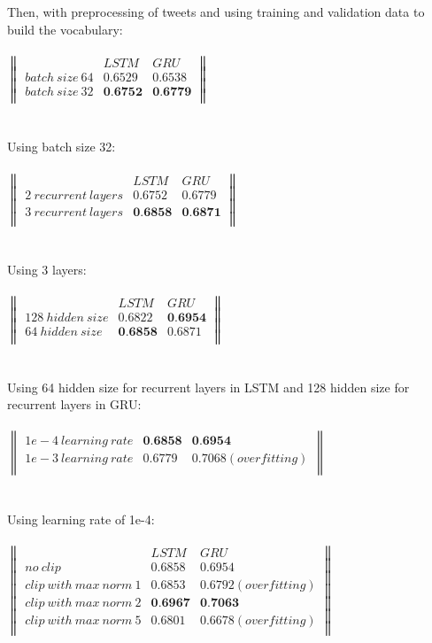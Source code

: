\documentclass{article}
\begin{document}
Then, with preprocessing of tweets and using training and validation data to build the vocabulary: \\ \\
$\begin{Vmatrix}
& LSTM & GRU \\
batch\ size\ 64  & 0.6529 & 0.6538\\
batch\ size\ 32  & \textbf{0.6752} & \textbf{0.6779}\\
\end{Vmatrix}$ \\ \\ \\
Using batch size 32: \\ \\
$\begin{Vmatrix}
& LSTM & GRU \\
2\ recurrent\ layers  & 0.6752 & 0.6779\\
3\ recurrent\ layers  & \textbf{0.6858} & \textbf{0.6871}\\
\end{Vmatrix}$ \\ \\ \\
Using 3 layers: \\ \\
$\begin{Vmatrix}
& LSTM & GRU \\
128\ hidden\ size  & 0.6822 & \textbf{0.6954}\\
64\ hidden\ size  & \textbf{0.6858} & 0.6871\\
\end{Vmatrix}$ \\ \\ \\
Using 64 hidden size for recurrent layers in LSTM and 128 hidden size for recurrent layers in GRU: \\ \\
$\begin{Vmatrix}
1e-4\ learning\ rate & \textbf{0.6858} & \textbf{0.6954}\\
1e-3\ learning\ rate & 0.6779 & 0.7068(overfitting)\\
\end{Vmatrix}$ \\ \\ \\
Using learning rate of 1e-4: \\ \\
$\begin{Vmatrix}
& LSTM & GRU \\
no\ clip  & 0.6858 & 0.6954\\
clip\ with\ max\ norm\ 1  & 0.6853 & 0.6792(overfitting)\\
clip\ with\ max\ norm\ 2  & \textbf{0.6967} & \textbf{0.7063}\\
clip\ with\ max\ norm\ 5  & 0.6801 & 0.6678(overfitting)\\
\end{Vmatrix}$\\ \\ \\
\end{document}
